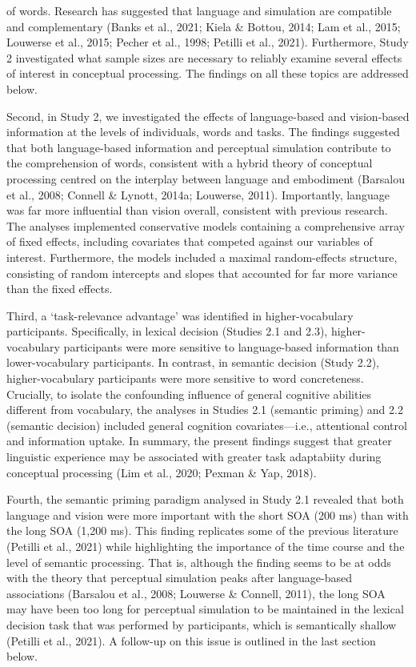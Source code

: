 \documentclass[
  12pt,
  man,floatsintext]{apa7}
\begin{document}
of words. Research has suggested that language and simulation are compatible and complementary (Banks et al., 2021; Kiela \& Bottou, 2014; Lam et al., 2015; Louwerse et al., 2015; Pecher et al., 1998; Petilli et al., 2021). Furthermore, Study 2 investigated what sample sizes are necessary to reliably examine several effects of interest in conceptual processing. The findings on all these topics are addressed below.

Second, in Study 2, we investigated the effects of language-based and vision-based information at the levels of individuals, words and tasks. The findings suggested that both language-based information and perceptual simulation contribute to the comprehension of words, consistent with a hybrid theory of conceptual processing centred on the interplay between language and embodiment (Barsalou et al., 2008; Connell \& Lynott, 2014a; Louwerse, 2011). Importantly, language was far more influential than vision overall, consistent with previous research. The analyses implemented conservative models containing a comprehensive array of fixed effects, including covariates that competed against our variables of interest. Furthermore, the models included a maximal random-effects structure, consisting of random intercepts and slopes that accounted for far more variance than the fixed effects.

Third, a `task-relevance advantage' was identified in higher-vocabulary participants. Specifically, in lexical decision (Studies 2.1 and 2.3), higher-vocabulary participants were more sensitive to language-based information than lower-vocabulary participants. In contrast, in semantic decision (Study 2.2), higher-vocabulary participants were more sensitive to word concreteness. Crucially, to isolate the confounding influence of general cognitive abilities different from vocabulary, the analyses in Studies 2.1 (semantic priming) and 2.2 (semantic decision) included general cognition covariates---i.e., attentional control and information uptake. In summary, the present findings suggest that greater linguistic experience may be associated with greater task adaptabiity during conceptual processing (Lim et al., 2020; Pexman \& Yap, 2018).

Fourth, the semantic priming paradigm analysed in Study 2.1 revealed that both language and vision were more important with the short SOA (200 ms) than with the long SOA (1,200 ms). This finding replicates some of the previous literature (Petilli et al., 2021) while highlighting the importance of the time course and the level of semantic processing. That is, although the finding seems to be at odds with the theory that perceptual simulation peaks after language-based associations (Barsalou et al., 2008; Louwerse \& Connell, 2011), the long SOA may have been too long for perceptual simulation to be maintained in the lexical decision task that was performed by participants, which is semantically shallow (Petilli et al., 2021). A follow-up on this issue is outlined in the last section below.
\end{document}
